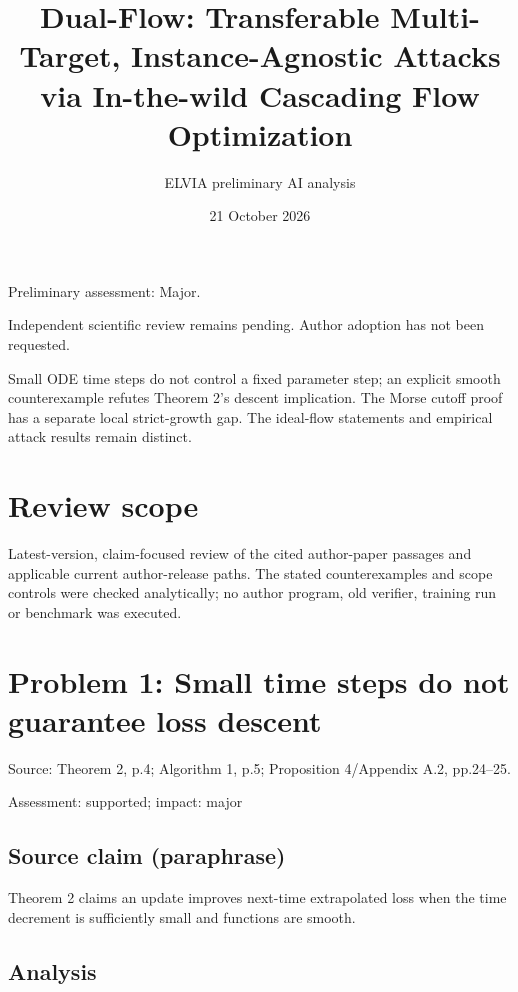 \documentclass[11pt]{article}
\begin{document}
\title{Dual-Flow: Transferable Multi-Target, Instance-Agnostic Attacks via In-the-wild Cascading Flow Optimization}

\author{ELVIA preliminary AI analysis}\date{21 October 2026}\maketitle

Preliminary assessment: Major.\par

Independent scientific review remains pending. Author adoption has not been requested.

Small ODE time steps do not control a fixed parameter step; an explicit smooth counterexample refutes Theorem 2's descent implication. The Morse cutoff proof has a separate local strict-growth gap. The ideal-flow statements and empirical attack results remain distinct.

\section*{Review scope}

Latest-version, claim-focused review of the cited author-paper passages and applicable current author-release paths. The stated counterexamples and scope controls were checked analytically; no author program, old verifier, training run or benchmark was executed.

\section*{Problem 1: Small time steps do not guarantee loss descent}

Source: Theorem 2, p.4; Algorithm 1, p.5; Proposition 4/Appendix A.2, pp.24–25.

Assessment: supported; impact: major

\subsection*{Source claim (paraphrase)}

Theorem 2 claims an update improves next-time extrapolated loss when the time decrement is sufficiently small and functions are smooth.

\subsection*{Analysis}
\end{document}
